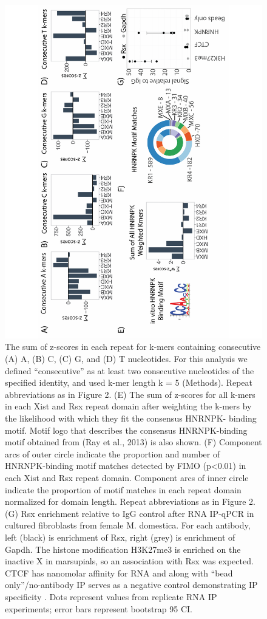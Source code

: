 \begin{figure}[h!]
\centering
\includegraphics[angle=-90, width=.95\textwidth]{images/fig4_G-01.pdf}
\caption{The sum of z-scores in each repeat for k-mers containing consecutive (A) A, (B) C, (C) G, and (D) T nucleotides. For this analysis we defined “consecutive” as at least two consecutive nucleotides of the specified identity, and used k-mer length k = 5 (Methods). Repeat abbreviations as in Figure 2. (E) The sum of z-scores for all k-mers in each Xist and Rsx repeat domain after weighting the k-mers by the likelihood with which they fit the consensus HNRNPK- binding motif. Motif logo that describes the consensus HNRNPK-binding motif obtained from (Ray et al., 2013) is also shown. (F) Component arcs of outer circle indicate the proportion and number of HNRNPK-binding motif matches detected by FIMO (p<0.01) in each Xist and Rsx repeat domain. Component arcs of inner circle indicate the proportion of motif matches in each repeat domain normalized for domain length. Repeat abbreviations as in Figure 2. (G) Rsx enrichment relative to IgG control after RNA IP-qPCR in cultured fibroblasts from female M. domestica. For each antibody, left (black) is enrichment of Rsx, right (grey) is enrichment of Gapdh. The histone modification H3K27me3 is enriched on the inactive X in marsupials, so an association with Rsx was expected. CTCF has nanomolar affinity for RNA and along with “bead only”/no-antibody IP serves as a negative control demonstrating IP specificity \cite{Kung2015Locus-specificCTCF}. Dots represent values from replicate RNA IP experiments; error bars represent bootstrap 95 CI.}
\end{figure}

